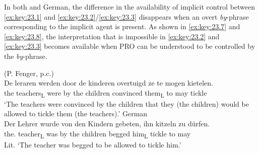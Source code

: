 \documentclass[output=paper]{langsci/langscibook}
\begin{document}
\ea%
    \label{ex:key:23.6}
\z
%
In both  and German, the difference in the availability of implicit
control between \eqref{ex:key:23.1} and \eqref{ex:key:23.2}/\eqref{ex:key:23.3}
disappears when an overt \emph{by}-phrase corresponding to the implicit agent
is present. As shown in \eqref{ex:key:23.7} and \eqref{ex:key:23.8}, the
interpretation that is impossible in \eqref{ex:key:23.2} and
\eqref{ex:key:23.3} becomes available when PRO can be understood to be
controlled by the \emph{by}-phrase.

\ea\label{ex:key:23.7}
	\ea\label{ex:key:23.7a}  (P. Fenger, p.c.)\\
    \sn
		\gll De leraren  werden  door de kinderen  overtuigd  ze  te mogen  kietelen.\\
			the teachers\textsubscript{L}  were  by the children  convinced  them\textsubscript{L}  to may  tickle\\
		\glt ‘The teachers were convinced by the children that they (the
        children) would be allowed to tickle them (the teachers).’\newpage
	\ex\label{ex:key:23.7b} German\\
    \sn
		\gll Der Lehrer  wurde  von den Kindern  gebeten,  ihn  kitzeln  zu dürfen.\\
			the.\Nom{} teacher\textsubscript{L}  was  by the children  begged  him\textsubscript{L}  tickle  to may\\
		\glt Lit. ‘The teacher was begged to be allowed to tickle him.’
	\z
\z
\end{document}
